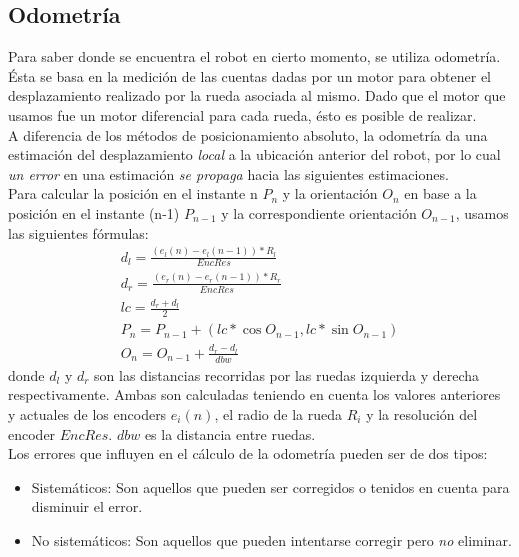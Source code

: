 \subsection{Odometr\'ia}
\label{odometry}
Para saber donde se encuentra el robot en cierto momento, se utiliza
odometr\'ia.
\\
\'Esta se basa en la medici\'on de las cuentas dadas por un motor para obtener
el desplazamiento realizado por la rueda asociada al mismo. Dado que el motor
que usamos fue un motor diferencial para cada rueda, \'esto es posible de
realizar.
\\
A diferencia de los m\'etodos de posicionamiento absoluto, la odometr\'ia
da una estimaci\'on del desplazamiento \emph{local} a la ubicaci\'on anterior
del robot, por lo cual \emph{un error} en una estimaci\'on \emph{se propaga}
hacia las siguientes estimaciones. 
\\
Para calcular la posici\'on en el instante n $P_n$ y la orientaci\'on $O_n$
en base a la posici\'on en el instante (n-1) $P_{n-1}$ y la correspondiente
orientaci\'on $O_{n-1}$, usamos las siguientes f\'ormulas:
\begin{eqnarray}
d_l = \frac{(e_l(n) - e_l(n-1)) * R_l}{EncRes} \\
d_r = \frac{(e_r(n) - e_r(n-1)) * R_r}{EncRes} \\
lc = \frac{d_r + d_l}{2} \\
P_n = P_{n-1} + (lc * \cos{O_{n-1}},lc * \sin{O_{n-1}}) \\
O_n = O_{n-1} + \frac{d_r - d_l}{dbw}
\end{eqnarray}
donde $d_l$ y $d_r$ son las distancias recorridas por las ruedas izquierda y
derecha respectivamente. Ambas son calculadas teniendo en cuenta los valores
anteriores y actuales de los encoders $e_i(n)$, el radio de la rueda $R_i$ y
la resoluci\'on del encoder $EncRes$. $dbw$ es la distancia entre ruedas.
\\
Los errores que influyen en el c\'alculo de la odometr\'ia pueden ser de dos
tipos:

\begin{itemize}

\item{Sistem\'aticos:} Son aquellos que pueden ser corregidos o tenidos en
cuenta para disminuir el error.

\item{No sistem\'aticos:} Son aquellos que pueden intentarse corregir pero
\emph{no} eliminar.

\end{itemize}

